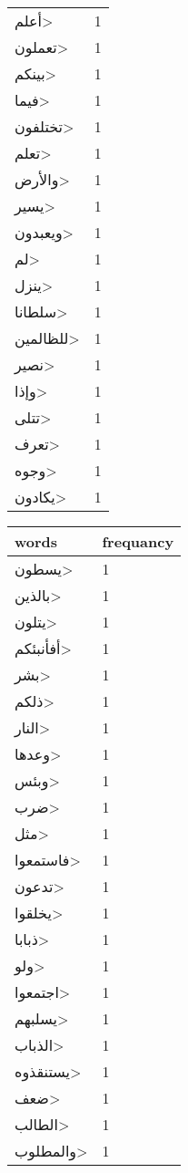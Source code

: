 \documentclass{article}
\begin{document}
\begin{multicols}{3}
\begin{center}
\begin{tabular}{ P{2cm}  P{1cm}}
\<أعلم> & 1 \\ 
\<تعملون> & 1 \\ 
\<بينكم> & 1 \\ 
\<فيما> & 1 \\ 
\<تختلفون> & 1 \\ 
\<تعلم> & 1 \\ 
\<والأرض> & 1 \\ 
\<يسير> & 1 \\ 
\<ويعبدون> & 1 \\ 
\<لم> & 1 \\ 
\<ينزل> & 1 \\ 
\<سلطانا> & 1 \\ 
\<للظالمين> & 1 \\ 
\<نصير> & 1 \\ 
\<وإذا> & 1 \\ 
\<تتلى> & 1 \\ 
\<تعرف> & 1 \\ 
\<وجوه> & 1 \\ 
\<يكادون> & 1 \\ 
\end{tabular} 
\begin{tabular}{ P{2cm}  P{1cm}} 
\textbf{words}    & \textbf{frequancy}  \\
\hline
\<يسطون> & 1 \\ 
\<بالذين> & 1 \\ 
\<يتلون> & 1 \\ 
\<أفأنبئكم> & 1 \\ 
\<بشر> & 1 \\ 
\<ذلكم> & 1 \\ 
\<النار> & 1 \\ 
\<وعدها> & 1 \\ 
\<وبئس> & 1 \\ 
\<ضرب> & 1 \\ 
\<مثل> & 1 \\ 
\<فاستمعوا> & 1 \\ 
\<تدعون> & 1 \\ 
\<يخلقوا> & 1 \\ 
\<ذبابا> & 1 \\ 
\<ولو> & 1 \\ 
\<اجتمعوا> & 1 \\ 
\<يسلبهم> & 1 \\ 
\<الذباب> & 1 \\ 
\<يستنقذوه> & 1 \\ 
\<ضعف> & 1 \\ 
\<الطالب> & 1 \\ 
\<والمطلوب> & 1 \\ 

\end{tabular}
\end{center}
\end{multicols}
\end{document}
